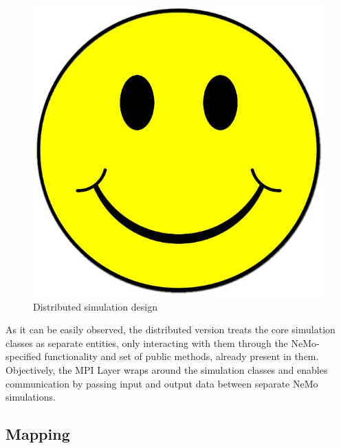 \begin{figure}[h]
\begin{center}
\includegraphics[scale = 0.1]{images/placeholder.jpg}
\end{center}
\caption{Distributed simulation design}
\end{figure}

As it can be easily observed, the distributed version treats the core simulation classes as separate entities, only interacting with them through the NeMo-specified functionality and set of public methods, already present in them.
Objectively, the MPI Layer wraps around the simulation classes and enables communication by passing input and output data between separate NeMo simulations.

\subsection{Mapping}

